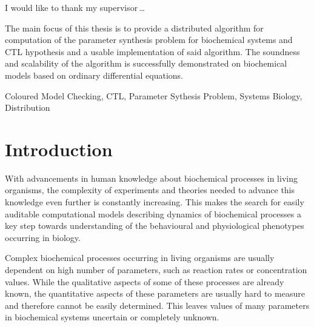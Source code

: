 \documentclass[12pt,oneside]{fithesis2}
\begin{document}
  \FrontMatter                    %
    \ThesisTitlePage                %
    \begin{ThesisDeclaration}       %
      \DeclarationText
      \AdvisorName
    \end{ThesisDeclaration}
    \begin{ThesisThanks}            %
      I would like to thank my supervisor\,\dots
    \end{ThesisThanks}
    \begin{ThesisAbstract}          %
      The main focus of this thesis is to provide a distributed algorithm for computation of the parameter synthesis problem for biochemical systems and CTL hypothesis and a usable implementation of said algorithm. The soundness and scalability of the algorithm is successfully demonstrated on biochemical models based on ordinary differential equations. 
    \end{ThesisAbstract}
    \begin{ThesisKeyWords}          %
		Coloured Model Checking, CTL, Parameter Sythesis Problem, Systems Biology, Distribution
    \end{ThesisKeyWords}
    \tableofcontents                %
  
  \MainMatter                     %
    \chapter{Introduction}          %
	
		With advancements in human knowledge about biochemical processes in living organisms, the complexity of experiments and theories needed to advance this knowledge even further is constantly increasing. This makes the search for easily auditable computational models describing dynamics of biochemical processes a key step towards understanding of the behavioural and physiological phenotypes occurring in biology.
		
		Complex biochemical processes occurring in living organisms are usually dependent on high number of parameters, such as reaction rates or concentration values. While the qualitative aspects of some of these processes are already known, the quantitative aspects of these parameters are usually hard to measure and therefore cannot be easily determined. This leaves values of many parameters in biochemical systems uncertain or completely unknown.
		
\end{document}
